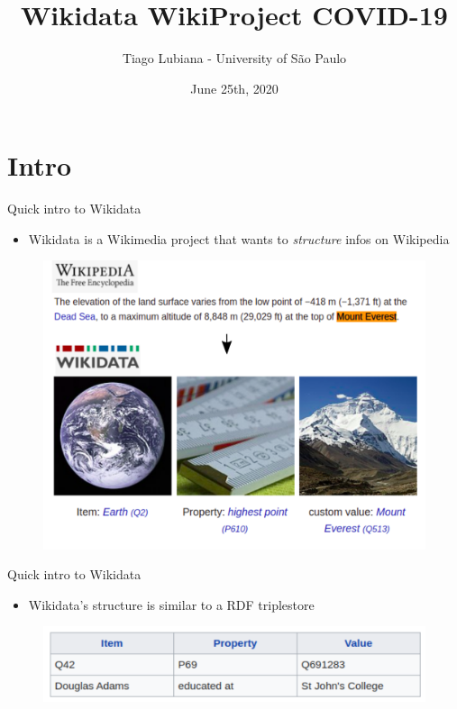 \documentclass{beamer}
\title[Wikidata WikiProject COVID-19]{Wikidata WikiProject COVID-19}
\author[User:TiagoLubiana]{Tiago Lubiana - University of São Paulo}
\date[25/06/2020]{June 25th, 2020}
\begin{document}
\begin{frame}
  \titlepage
\end{frame}



\section{Intro}

\begin{frame}{Quick intro to Wikidata}

\begin{itemize}
    \item Wikidata is a Wikimedia project that wants to \textit{structure} infos on Wikipedia
\end{itemize}

\begin{figure}
\includegraphics[scale=0.45]{fig/intro wikidata.png}
\end{figure}

\end{frame}


\begin{frame}{Quick intro to Wikidata}

\begin{itemize}
    \item Wikidata's structure is similar to a RDF triplestore
\end{itemize}
\begin{figure}
\includegraphics[scale=0.45]{fig/item_property_value.png}
\end{figure}

\end{frame}
\end{document}
